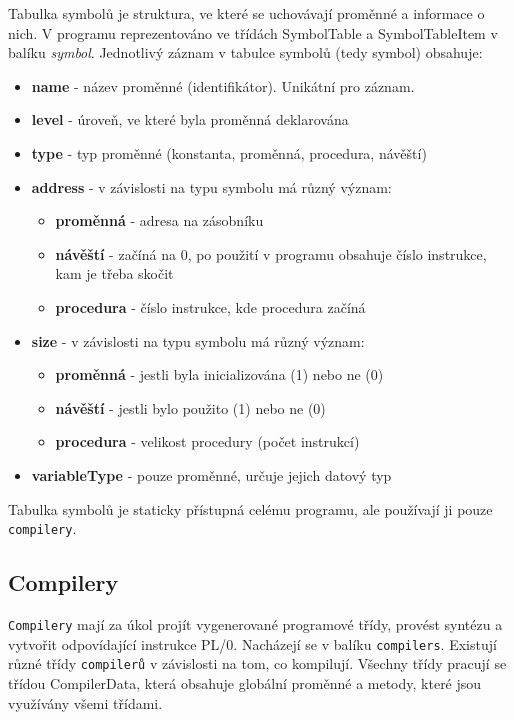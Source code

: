 \documentclass[
12pt,
a4paper,
pdftex,
czech,
titlepage
]{report}
\begin{document}
  Tabulka symbolů je struktura, ve které se uchovávají proměnné a informace o nich. V programu reprezentováno ve třídách SymbolTable a SymbolTableItem v balíku \textit{symbol}. Jednotlivý záznam v tabulce symbolů (tedy symbol) obsahuje:
  \begin{itemize}
  \item \textbf{name} - název proměnné (identifikátor). Unikátní pro záznam.
  \item \textbf{level} - úroveň, ve které byla proměnná deklarována
  \item \textbf{type} - typ proměnné (konstanta, proměnná, procedura, návěští)
  \item \textbf{address} - v závislosti na typu symbolu má různý význam:
  \begin{itemize}
  \item \textbf{proměnná} - adresa na zásobníku
  \item \textbf{návěští} - začíná na 0, po použití v programu obsahuje číslo instrukce, kam je třeba skočit
  \item \textbf{procedura} - číslo instrukce, kde procedura začíná
  \end{itemize}
  \item \textbf{size} - v závislosti na typu symbolu má různý význam:
  \begin{itemize}
  \item \textbf{proměnná} - jestli byla inicializována (1) nebo ne (0)
  \item \textbf{návěští} - jestli bylo použito (1) nebo ne (0)
  \item \textbf{procedura} - velikost procedury (počet instrukcí)
\end{itemize} 
\item \textbf{variableType} - pouze proměnné, určuje jejich datový typ  
  \end{itemize} 
  
  Tabulka symbolů je staticky přístupná celému programu, ale používají ji pouze \texttt{compilery}.
  
 \subsection{Compilery}
 
 \texttt{Compilery} mají za úkol projít vygenerované programové třídy, provést syntézu a vytvořit odpovídající instrukce PL/0. Nacházejí se v balíku \texttt{compilers}. Existují různé třídy \texttt{compilerů} v závislosti na tom, co kompilují. Všechny třídy pracují se třídou CompilerData, která obsahuje globální proměnné a metody, které jsou využívány všemi třídami.
 
\end{document}
